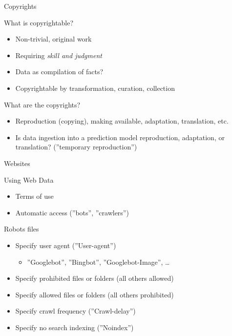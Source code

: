 \documentclass[ignorenonframetext,xcolor=x11names]{beamer}
\begin{document}
\begin{frame}[label=full]{Copyrights}
  \begin{block}{What is copyrightable?}
  \begin{itemize}
     \item Non-trivial, original work
     \item Requiring \emph{skill and judgment}
     \item Data as compilation of facts?
     \item Copyrightable by transformation, curation, collection 
     \end{itemize}
  \end{block}
  \begin{block}{What are the copyrights?}
  \begin{itemize}
     \item Reproduction (copying), making available, adaptation, translation, etc.
     \item Is data ingestion into a prediction model reproduction, adaptation, or translation? (''temporary reproduction'')
  \end{itemize}
  \end{block}
\end{frame}

\begin{frame}[label=full]{Websites}
  \begin{block}{Using Web Data}
  \begin{itemize}
     \item Terms of use 
     \item Automatic access (''bots'', ''crawlers'')
  \end{itemize}
  \end{block}
  \begin{block}{Robots files}
     \begin{itemize}
       \item Specify user agent (''User-agent'')
       \begin{itemize}
          \item ''Googlebot'', ''Bingbot'', ''Googlebot-Image'', \ldots
       \end{itemize}
       \item Specify prohibited files or folders (all others allowed)
       \item Specify allowed files or folders (all others prohibited)
       \item Specify crawl frequency (''Crawl-delay'')
       \item Specify no search indexing (''Noindex'')
     \end{itemize}
  \end{block}
\end{frame}
\end{document}
